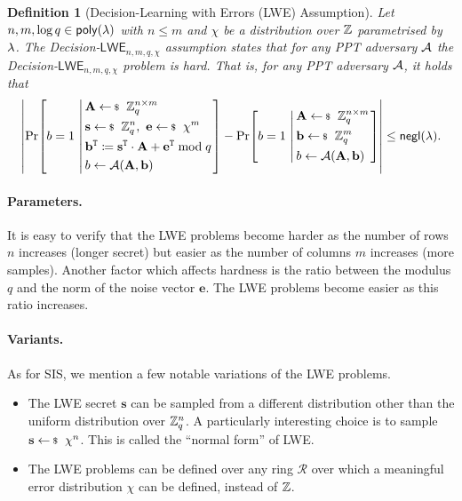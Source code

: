 \documentclass[10pt,twoside]{article}
\newtheorem{definition}[theorem]{Definition}
\renewcommand{\vec}[1]{\mathbf{#1}}
\newcommand{\mat}[1]{\mathbf{#1}}
\newcommand{\transpose}{\mathtt{T}}
\newcommand{\LWE}{\mathsf{LWE}}
\newcommand{\ring}{\mathcal{R}}
\begin{document}
\begin{definition}[Decision-Learning with Errors (LWE) Assumption]
    Let $n, m, \log q \in \poly$ with $n \leq m$ and $\chi$ be a distribution over $\mathbb{Z}$ parametrised by $\lambda$.
    The Decision-$\LWE_{n,m,q,\chi}$ assumption states that for any PPT adversary $\mathcal{A}$ the Decision-$\LWE_{n,m,q,\chi}$ problem is hard.
    That is, for any PPT adversary $\mathcal{A}$, it holds that
    \[
        \abs{
        \condprob{
            b = 1
        }
        {
            \begin{aligned}
                &\mat{A} \sample \ZZ_q^{n \times m} \\
                &\vec{s} \sample \ZZ_q^n,~\vec{e} \sample \chi^m \\
                &\vec{b}^\transpose \coloneqq \vec{s}^\transpose \cdot \mat{A} + \vec{e}^\transpose \bmod q \\
                &b \gets \adv(\mat{A},\vec{b}) \\
            \end{aligned}
        }
        -
        \condprob{
            b = 1
        }
        {
            \begin{aligned}
                &\mat{A} \sample \ZZ_q^{n \times m} \\
                &\vec{b} \sample \ZZ_q^m \\
                &b \gets \adv(\mat{A},\vec{b}) \\
            \end{aligned}
        }}
        \leq \negl.
    \]
\end{definition}

\paragraph{Parameters.}
It is easy to verify that the LWE problems become harder as the number of rows $n$ increases (longer secret) but easier as the number of columns $m$ increases (more samples).
Another factor which affects hardness is the ratio between the modulus $q$ and the norm of the noise vector $\vec{e}$.
The LWE problems become easier as this ratio increases.

\paragraph{Variants.}
As for SIS, we mention a few notable variations of the LWE problems.
\begin{itemize}
    \item The LWE secret $\vec{s}$ can be sampled from a different distribution other than the uniform distribution over $\mathbb{Z}_q^n$. A particularly interesting choice is to sample $\vec{s} \sample \chi^n$. This is called the ``normal form'' of LWE.
\item The LWE problems can be defined over any ring $\ring$ over which a meaningful error distribution $\chi$ can be defined, instead of $\mathbb{Z}$.
\end{itemize}
\end{document}

